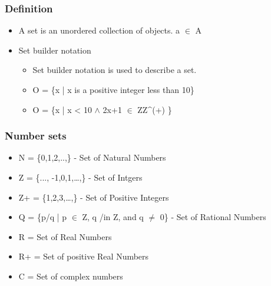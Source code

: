 \documentclass[11pt]{article}
\begin{document}
\subsubsection{Definition}
\label{sec-2-1-1}
\begin{itemize}

\item A set is an unordered collection of objects. a $\in$ A
\label{sec-2-1-1-1}%

\item Set builder notation
\label{sec-2-1-1-2}%
\begin{itemize}

\item Set builder notation is used to describe a set.
\label{sec-2-1-1-2-1}%

\item O = \{x | x is a positive integer less than 10\}
\label{sec-2-1-1-2-2}%

\item O = \{x | x < 10 $\wedge$ 2x+1 $\in$ ZZ^(+) \}
\label{sec-2-1-1-2-3}%
\end{itemize} %
\end{itemize} %
\subsubsection{Number sets}
\label{sec-2-1-2}
\begin{itemize}

\item N = \{0,1,2,..,\} - Set of Natural Numbers
\label{sec-2-1-2-1}%

\item Z = \{..., -1,0,1,\ldots{},\} - Set of Intgers
\label{sec-2-1-2-2}%

\item Z+ = \{1,2,3,\ldots{},\} - Set of Positive Integers
\label{sec-2-1-2-3}%

\item Q = \{p/q | p $\in$ Z, q /in Z, and q $\ne$ 0\} - Set of Rational Numbers
\label{sec-2-1-2-4}%

\item R = Set of Real Numbers
\label{sec-2-1-2-5}%

\item R+ = Set of positive Real Numbers
\label{sec-2-1-2-6}%

\item C = Set of complex numbers
\label{sec-2-1-2-7}%
\end{itemize} %
\end{document}

